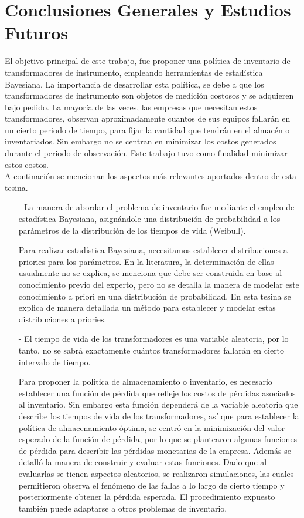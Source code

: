 
\chapter{Conclusiones Generales y Estudios Futuros}

\noindent El objetivo principal de este trabajo, fue proponer una pol\'itica de inventario de transformadores de instrumento, empleando herramientas de estad\'istica Bayesiana. La importancia de desarrollar esta pol\'itica, se debe a que los transformadores de instrumento son objetos de medici\'on costosos y se adquieren bajo pedido. La mayor\'ia de las veces, las  empresas que necesitan estos transformadores, observan aproximadamente cuantos de sus equipos fallar\'an en un cierto periodo de tiempo, para fijar la cantidad que tendr\'an en el almac\'en o inventariados. Sin embargo no se centran en minimizar los costos generados durante el periodo de observaci\'on. Este trabajo tuvo como finalidad minimizar estos costos.\\[0.1cm]
A continaci\'on  se mencionan los aspectos m\'as relevantes aportados dentro de esta tesina.
\begin{itemize}
\item[-] La manera de abordar el problema de inventario fue mediante el empleo de estad\'istica Bayesiana, asign\'andole una distribuci\'on de probabilidad a los par\'ametros de la distribuci\'on de los tiempos de vida (Weibull).


\noindent Para realizar estad\'istica Bayesiana, necesitamos establecer distribuciones a priories para los par\'ametros. En la literatura, la determinaci\'on de ellas usualmente no se explica, se menciona que debe ser construida en base al conocimiento previo del experto, pero no se detalla la manera de modelar este conocimiento a priori en una distribuci\'on de probabilidad.
En esta tesina se explica de manera detallada un m\'etodo para establecer y modelar estas distribuciones a priories. 
\item[-] El tiempo de vida de los transformadores es una variable aleatoria, por lo tanto, no se sabr\'a exactamente cu\'antos transformadores fallar\'an en cierto intervalo de tiempo.

\noindent Para proponer la pol\'itica de almacenamiento o inventario, es necesario establecer una funci\'on de p\'erdida que  refleje los costos de p\'erdidas asociados al inventario. Sin embargo esta funci\'on depender\'a de la variable aleatoria que describe los tiempos de vida de los transformadores, as\'i que para establecer la  pol\'itica de almacenamiento \'optima, se  centr\'o en la minimizaci\'on del valor esperado de la funci\'on de p\'erdida, por lo que se plantearon algunas funciones de p\'erdida para describir las p\'erdidas monetarias de la empresa. Adem\'as se detall\'o la manera de construir y evaluar estas funciones. Dado que al evaluarlas se tienen aspectos aleatorios, se realizaron simulaciones, las cuales permitieron observa el fen\'omeno de las fallas a lo largo de cierto tiempo y posteriormente obtener la p\'erdida esperada.
El procedimiento expuesto tambi\'en puede adaptarse a otros problemas de inventario.
\end{itemize}

